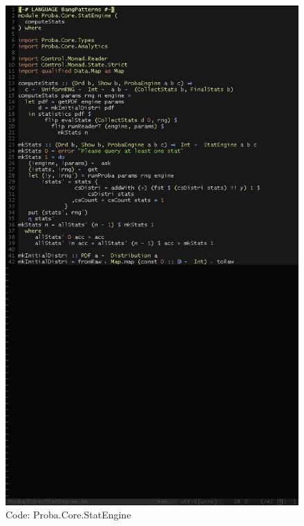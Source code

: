 \documentclass[12pt,a4paper,titlepage]{article}
\begin{document}
\begin{figure}[h!]
\centering
\includegraphics[width=1\textwidth]{img/code-se.png}
\caption{Code: Proba.Core.StatEngine}
\label{fig:core.se}
\end{figure}
\end{document}
